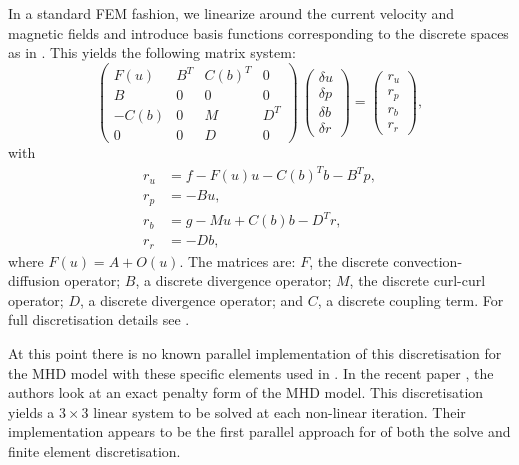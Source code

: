 \documentclass[10pt]{article}
\begin{document}
In a standard FEM fashion, we linearize around the current velocity and magnetic fields and introduce basis functions corresponding to the discrete spaces as in \cite{schotzau2004mixed}. This yields the following matrix system:
\begin{equation}
\label{eq:mhd_saddle}
\left(
\begin{array}{cccc}
F(u) & B^T & C(b)^T & 0\\
B & 0 & 0 & 0 \\
-C(b) & 0 & M & D^T\\
0 & 0 & D & 0
\end{array}
\right)
\,
\left(
\begin{array}{c}
\delta u\\
\delta p\\
\delta b\\
\delta r
\end{array}
\right)  =
\begin{pmatrix}
r_u \\
r_p\\
r_b\\
r_r
\end{pmatrix},
\end{equation}
with
\begin{equation} \nonumber
\begin{array}{rl}
r_u &= f- F(u) u - C(b)^T b- B^T p,\\
r_p &=-B u,\\
r_b &=g-Mu+C(b)b-D^T r,\\
r_r &=-D b,
\end{array}
\end{equation}
where $F(u) = A+O(u)$. The matrices are: ${F}$, the discrete convection-diffusion operator; ${B}$, a discrete divergence operator; ${M}$, the discrete curl-curl operator; ${D}$, a discrete divergence operator; and ${C}$, a discrete coupling term. For full discretisation details see \cite[Chapter 2]{mythesis}.

At this point there is no known parallel implementation of this discretisation for the MHD model with these specific elements used in \cite{schotzau2004mixed}. In the recent paper \cite{phillips2014block}, the authors look at an exact penalty form of the MHD model. This discretisation yields a $3\times3$ linear system to be solved at each non-linear iteration. Their implementation appears to be the first parallel approach for of both the solve and finite element discretisation.
\end{document}
